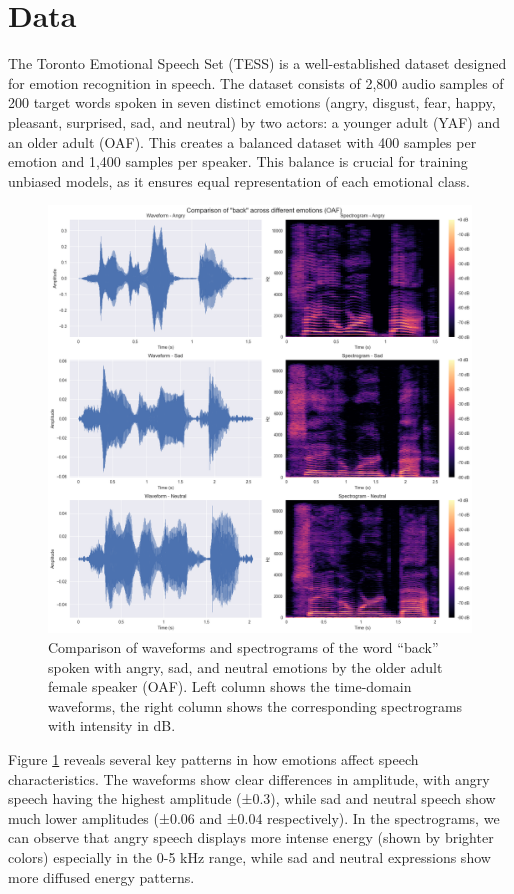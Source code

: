 \documentclass[../main.tex]{subfiles}
\begin{document}
\section{Data}
The Toronto Emotional Speech Set (TESS) is a well-established dataset 
designed for emotion recognition in speech. The dataset consists of 2,800 
audio samples of 200 target words spoken in seven distinct emotions 
(angry, disgust, fear, happy, pleasant, surprised, sad, and neutral) 
by two actors: a younger adult (YAF) and an older adult (OAF). 
This creates a balanced dataset with 400 samples per emotion and 1,400 
samples per speaker. This balance is crucial for training unbiased models, 
as it ensures equal representation of each emotional class.

\begin{figure}[h]
    \centering
    \includegraphics[width= 350pt]{tess_analysis.png}
    \caption{Comparison of waveforms and spectrograms of the word ``back'' spoken with angry, sad, and neutral emotions by the older adult female speaker (OAF). Left column shows the time-domain waveforms, the right column shows the corresponding spectrograms with intensity in dB.}
    \label{fig:analysis}
\end{figure}

Figure \ref{fig:analysis} reveals several key patterns in how emotions affect 
speech characteristics. The waveforms show clear differences in amplitude, with 
angry speech having the highest amplitude (±0.3), while sad and neutral speech 
show much lower amplitudes (±0.06 and ±0.04 respectively). In the spectrograms, 
we can observe that angry speech displays more intense energy 
(shown by brighter colors) especially in the 0-5 kHz range, while sad and 
neutral expressions show more diffused energy patterns.
\end{document}
